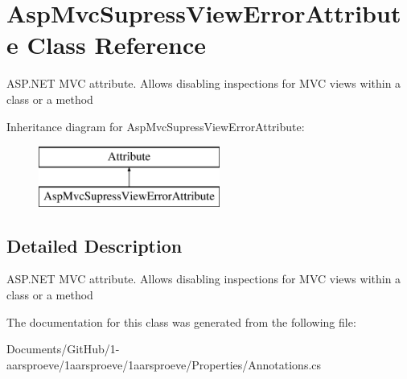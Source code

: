 \hypertarget{class_asp_mvc_supress_view_error_attribute}{}\section{Asp\+Mvc\+Supress\+View\+Error\+Attribute Class Reference}
\label{class_asp_mvc_supress_view_error_attribute}


A\+S\+P.\+N\+E\+T M\+V\+C attribute. Allows disabling inspections for M\+V\+C views within a class or a method  


Inheritance diagram for Asp\+Mvc\+Supress\+View\+Error\+Attribute\+:\begin{figure}[H]
\begin{center}
\leavevmode
\includegraphics[height=2.000000cm]{class_asp_mvc_supress_view_error_attribute}
\end{center}
\end{figure}


\subsection{Detailed Description}
A\+S\+P.\+N\+E\+T M\+V\+C attribute. Allows disabling inspections for M\+V\+C views within a class or a method 



The documentation for this class was generated from the following file\+:\begin{DoxyCompactItemize}
\item 
Documents/\+Git\+Hub/1-\/aarsproeve/1aarsproeve/1aarsproeve/\+Properties/Annotations.\+cs\end{DoxyCompactItemize}
